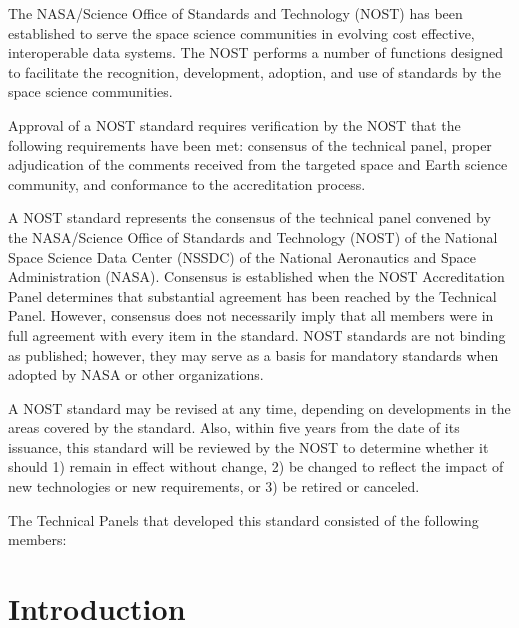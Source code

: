 \maketitle  
\begin{authority}
The NASA/Science Office of Standards and Technology
(NOST) has been established to 
serve the space science communities in evolving cost effective, interoperable
data systems. The NOST performs 
a number of functions designed to facilitate
the recognition, development, adoption, and use of standards by the space
science communities.

Approval of a NOST standard requires verification by the NOST that the
following requirements have been met: consensus of the technical 
panel, proper adjudication of the comments received 
from the targeted space and Earth science community, 
and conformance to the accreditation process.

A NOST standard represents the consensus of 
the technical panel convened by
the NASA/Science Office of Standards and Technology (NOST) 
of the National Space Science Data Center (NSSDC) 
of the National Aeronautics and Space Administration (NASA). 
Consensus is established when the NOST Accreditation
Panel determines that substantial agreement has been reached by the
Technical Panel.  However, consensus does not necessarily imply 
that all members were in
full agreement with every item in the standard. NOST standards are not
binding as published; however, they may serve as a basis for mandatory
standards when adopted by NASA or other organizations.

A NOST standard may be revised at any time, depending on 
developments in the areas covered by the standard. Also, within five 
years from the date of its issuance, this standard will be reviewed by 
the NOST to determine whether it should 1) remain in effect without
change,
2) be changed to reflect the impact of new technologies or new
requirements,
or 3) be retired or canceled.

The Technical Panels that developed this standard consisted of the following
members:
\end{authority}

\tableofcontents
\listoftables
\listoffigures

\chapter*{Introduction}
   \markboth{}{}

